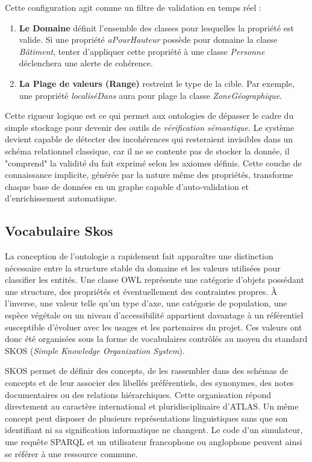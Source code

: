 \documentclass{article}
\begin{document}
Cette configuration agit comme un filtre de validation en temps réel :
\begin{enumerate}
    \item \textbf{Le Domaine} définit l'ensemble des classes pour lesquelles la propriété est valide. Si une propriété \textit{aPourHauteur} possède pour domaine la classe \textit{Bâtiment}, tenter d'appliquer cette propriété à une classe \textit{Personne} déclenchera une alerte de cohérence.
    \item \textbf{La Plage de valeurs (Range)} restreint le type de la cible. Par exemple, une propriété \textit{localiséDans} aura pour plage la classe \textit{ZoneGéographique}. 
\end{enumerate}

Cette rigueur logique est ce qui permet aux ontologies de dépasser le cadre du simple stockage pour devenir des outils de \textit{vérification sémantique}. Le système devient capable de détecter des incohérences qui resteraient invisibles dans un schéma relationnel classique, car il ne se contente pas de stocker la donnée, il "comprend" la validité du fait exprimé selon les axiomes définis. Cette couche de connaissance implicite, générée par la nature même des propriétés, transforme chaque base de données en un graphe capable d'auto-validation et d'enrichissement automatique.
\subsection{Vocabulaire Skos}

La conception de l'ontologie a rapidement fait apparaître une distinction nécessaire entre la structure stable du domaine et les valeurs utilisées pour classifier les entités. Une classe OWL représente une catégorie d'objets possédant une structure, des propriétés et éventuellement des contraintes propres. À l'inverse, une valeur telle qu'un type d'axe, une catégorie de population, une espèce végétale ou un niveau d'accessibilité appartient davantage à un référentiel susceptible d'évoluer avec les usages et les partenaires du projet. Ces valeurs ont donc été organisées sous la forme de vocabulaires contrôlés au moyen du standard SKOS (\textit{Simple Knowledge Organization System}).

SKOS permet de définir des concepts, de les rassembler dans des schémas de concepts et de leur associer des libellés préférentiels, des synonymes, des notes documentaires ou des relations hiérarchiques. Cette organisation répond directement au caractère international et pluridisciplinaire d'ATLAS. Un même concept peut disposer de plusieurs représentations linguistiques sans que son identifiant ni sa signification informatique ne changent. Le code d'un simulateur, une requête SPARQL et un utilisateur francophone ou anglophone peuvent ainsi se référer à une ressource commune.
\end{document}
